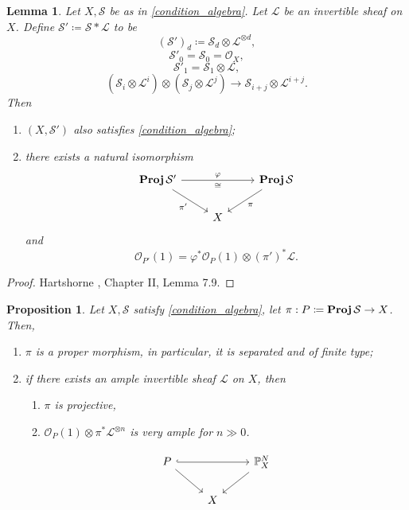 \documentclass[12pt]{article}
\DeclareMathOperator{\relProj}{\textnormal{\textbf{Proj}}}
\newtheorem*{proposition}{Proposition}
\newtheorem*{lemma}{Lemma}
\theoremstyle{definition}
\begin{document}
\begin{lemma}
Let $X,\mathcal{S}$ be as in \eqref{condition_algebra}. Let $\mathcal{L}$ be an invertible sheaf on $X$. Define $\mathcal{S}'\coloneqq\mathcal{S}*\mathcal{L}$ to be
\[(\mathcal{S}')_d\coloneqq\mathcal{S}_d\otimes\mathcal{L}^{\otimes d},\]
\[\mathcal{S}'_0=\mathcal{S}_0=\mathcal{O}_X,\]
\[\mathcal{S}'_1=\mathcal{S}_1\otimes\mathcal{L},\]
\[(\mathcal{S}_i\otimes\mathcal{L}^i)\otimes(\mathcal{S}_j\otimes\mathcal{L}^j)\longrightarrow\mathcal{S}_{i+j}\otimes\mathcal{L}^{i+j}.\]
Then
\begin{enumerate}[label=\arabic*)]
\item $(X,\mathcal{S}')$ also satisfies \eqref{condition_algebra};

\item there exists a natural isomorphism
\[
\begin{tikzcd}
\relProj\mathcal{S}'\arrow[rr,"\varphi","\cong"']\arrow[rd,"\pi'",swap]&&\relProj\mathcal{S}\arrow[ld,"\pi"]\\
&X
\end{tikzcd}
\]
and
\[\mathcal{O}_{P'}(1)=\varphi^*\mathcal{O}_P(1)\otimes(\pi')^*\mathcal{L}.\]
\end{enumerate}
\end{lemma}

\begin{proof}
Hartshorne \cite{hartshorne2013algebraic}, Chapter II, Lemma 7.9.
\end{proof}

\begin{proposition}
Let $X,\mathcal{S}$ satisfy \eqref{condition_algebra}, let $\pi:P\coloneqq\relProj\mathcal{S}\rightarrow X$. Then,
\begin{enumerate}[label=\arabic*)]
\item $\pi$ is a proper morphism, in particular, it is separated and of finite type;
\item if there exists an ample invertible sheaf $\mathcal{L}$ on $X$, then
\begin{enumerate}[label=\roman*)]
\item $\pi$ is projective,
\item $\mathcal{O}_P(1)\otimes\pi^*\mathcal{L}^{\otimes n}$ is very ample for $n\gg0$.
\end{enumerate}
\[
\begin{tikzcd}
P\arrow[rr,hook]\arrow[rd]&&\mathbb{P}_X^N\arrow[ld]\\
&X
\end{tikzcd}
\]
\end{enumerate}
\end{proposition}
\end{document}
